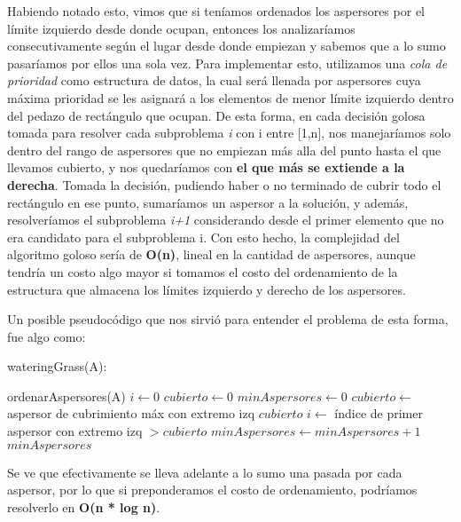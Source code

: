 Habiendo notado esto, vimos que si teníamos ordenados los aspersores por el límite izquierdo desde donde ocupan, entonces los analizaríamos consecutivamente según el lugar desde donde empiezan y sabemos que a lo sumo pasaríamos por ellos una sola vez. 
Para implementar esto, utilizamos una \textit{cola de prioridad} como estructura de datos, la cual será llenada por aspersores cuya máxima prioridad se les asignará a los elementos de menor límite izquierdo dentro del pedazo de rectángulo que ocupan. \newline
De esta forma, en cada decisión golosa tomada para resolver cada subproblema \textit{i} con i entre [1,n], nos manejaríamos solo dentro del rango de aspersores que no empiezan más alla del punto hasta el que llevamos cubierto, y nos quedaríamos con \textbf{el que más se extiende a la derecha}.  \newline
Tomada la decisión, pudiendo haber o no terminado de cubrir todo el rectángulo en ese punto, sumaríamos un aspersor a la solución, y además, resolveríamos el subproblema \textit{i+1} considerando desde el primer elemento que no era candidato para el subproblema {i}. Con esto hecho, la complejidad del algoritmo goloso sería de \textbf{O(n)}, lineal en la cantidad de aspersores, aunque tendría un costo algo mayor si tomamos el costo del ordenamiento de la estructura que almacena los límites izquierdo y derecho de los aspersores.

Un posible pseudocódigo que nos sirvió para entender el problema de esta forma, fue algo como: \newline

\begin{algorithm}
\caption{wateringGrass(A):}
\begin{algorithmic} 
\STATE ordenarAspersores(A)
\STATE $i \leftarrow 0$
\STATE $cubierto \leftarrow 0$
\STATE $minAspersores \leftarrow 0$
\STATE $cubierto \leftarrow $ aspersor de cubrimiento máx con extremo izq \leq $ cubierto$ \newline
\STATE $i \leftarrow $ índice de primer aspersor con extremo izq $ > cubierto$ 
\STATE $minAspersores \leftarrow minAspersores + 1$
\ENDWHILE
\RETURN $minAspersores$
\end{algorithmic}
\end{algorithm}

Se ve que efectivamente se lleva adelante a lo sumo una pasada por cada aspersor, por lo que si preponderamos el costo de ordenamiento, podríamos resolverlo en \textbf{O(n * log n)}. \newline

